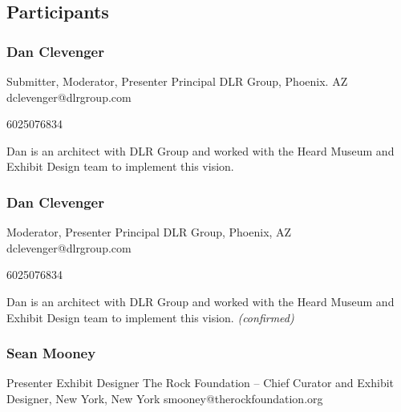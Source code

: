 \documentclass{report}
\begin{document}
            \subsection*{Participants}
              \subsubsection*{ Dan  Clevenger }
              Submitter, Moderator, Presenter\newline
              Principal\newline
              DLR Group, Phoenix. AZ
              \newline
              dclevenger@dlrgroup.com\newline
              
              6025076834\newline

              Dan is an architect with DLR Group and worked with the Heard Museum and Exhibit Design team to implement this vision.\newline


              
                \subsubsection*{ Dan  Clevenger }
                Moderator, Presenter\newline
                Principal\newline
                DLR Group, Phoenix, AZ
                \newline
                dclevenger@dlrgroup.com\newline
                
                6025076834\newline

                Dan is an architect with DLR Group and worked with the Heard Museum and Exhibit Design team to implement this vision.\newline
                \emph{ (confirmed) }
              

              
                \subsubsection*{ Sean  Mooney }
                Presenter\newline
                Exhibit Designer\newline
                The Rock Foundation – Chief Curator and Exhibit Designer, New York, New York
                \newline
                smooney@therockfoundation.org\newline
                
\end{document}
